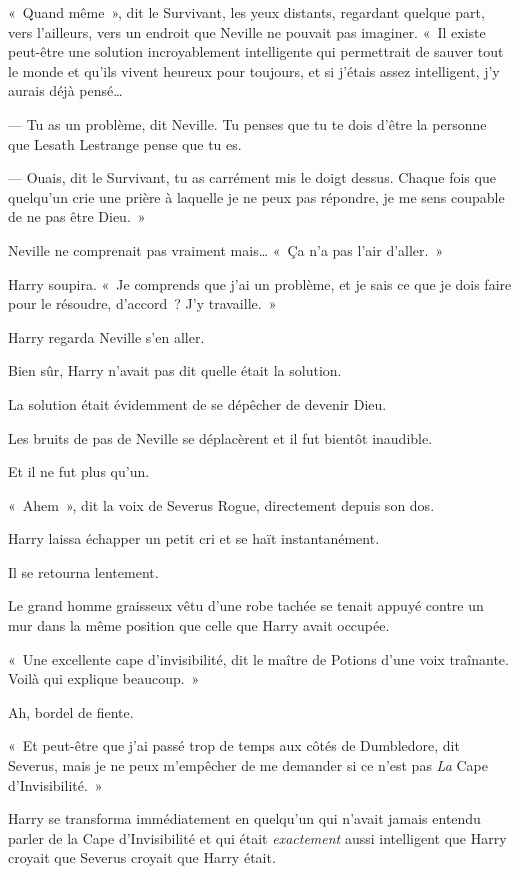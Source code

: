 «~Quand même~», dit le Survivant, les yeux distants, regardant quelque part, vers l'ailleurs, vers un endroit que Neville ne pouvait pas imaginer. «~Il existe peut-être une solution incroyablement intelligente qui permettrait de sauver tout le monde et qu'ils vivent heureux pour toujours, et si j'étais assez intelligent, j'y aurais déjà pensé…

--- Tu as un problème, dit Neville. Tu penses que tu te dois d'être la personne que Lesath Lestrange pense que tu es.

--- Ouais, dit le Survivant, tu as carrément mis le doigt dessus. Chaque fois que quelqu'un crie une prière à laquelle je ne peux pas répondre, je me sens coupable de ne pas être Dieu.~»

Neville ne comprenait pas vraiment mais… «~Ça n'a pas l'air d'aller.~»

Harry soupira. «~Je comprends que j'ai un problème, et je sais ce que je dois faire pour le résoudre, d'accord~? J'y travaille.~»

\later

Harry regarda Neville s'en aller.

Bien sûr, Harry n'avait pas dit quelle était la solution.

La solution était évidemment de se dépêcher de devenir Dieu.

Les bruits de pas de Neville se déplacèrent et il fut bientôt inaudible.

Et il ne fut plus qu'un.

«~Ahem~», dit la voix de Severus Rogue, directement depuis son dos.

Harry laissa échapper un petit cri et se haït instantanément.

Il se retourna lentement.

Le grand homme graisseux vêtu d’une robe tachée se tenait appuyé contre un mur dans la même position que celle que Harry avait occupée.

«~Une excellente cape d'invisibilité, dit le maître de Potions d'une voix traînante. Voilà qui explique beaucoup.~»

Ah, bordel de fiente.

«~Et peut-être que j'ai passé trop de temps aux côtés de Dumbledore, dit Severus, mais je ne peux m'empêcher de me demander si ce n'est pas \emph{La} Cape d'Invisibilité.~»

Harry se transforma immédiatement en quelqu'un qui n'avait jamais entendu parler de la Cape d'Invisibilité et qui était \emph{exactement} aussi intelligent que Harry croyait que Severus croyait que Harry était.

